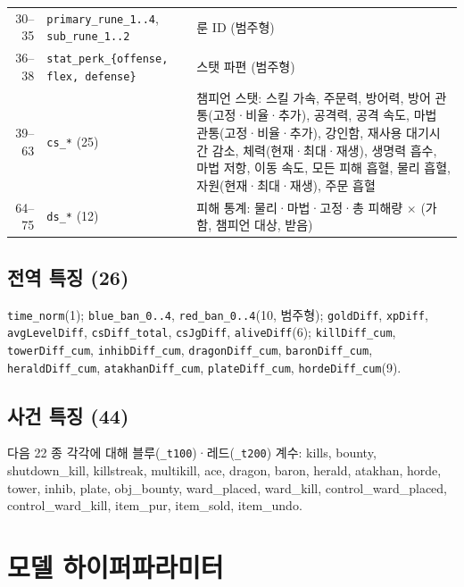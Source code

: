 \begin{longtable}{@{}r>{\raggedright\arraybackslash}p{6.0cm}>{\raggedright\arraybackslash}p{6.7cm}@{}}
  30--35 & \texttt{primary\_rune\_1..4}, \texttt{sub\_rune\_1..2} & 룬 ID (범주형) \\
  36--38 & \texttt{stat\_perk\_\{offense, flex, defense\}} & 스탯 파편 (범주형) \\
  39--63 & \texttt{cs\_*} (25) & 챔피언 스탯: 스킬 가속, 주문력, 방어력, 방어 관통(고정·비율·추가), 공격력, 공격 속도, 마법 관통(고정·비율·추가), 강인함, 재사용 대기시간 감소, 체력(현재·최대·재생), 생명력 흡수, 마법 저항, 이동 속도, 모든 피해 흡혈, 물리 흡혈, 자원(현재·최대·재생), 주문 흡혈 \\
  64--75 & \texttt{ds\_*} (12) & 피해 통계: 물리·마법·고정·총 피해량 $\times$ (가함, 챔피언 대상, 받음) \\
\end{longtable}

\section{전역 특징 (26)}

{\raggedright
\texttt{time\_norm}(1); \texttt{blue\_ban\_0..4}, \texttt{red\_ban\_0..4}(10, 범주형); \texttt{goldDiff}, \texttt{xpDiff}, \texttt{avgLevelDiff}, \texttt{csDiff\_total}, \texttt{csJgDiff}, \texttt{aliveDiff}(6); \texttt{killDiff\_cum}, \texttt{towerDiff\_cum}, \texttt{inhibDiff\_cum}, \texttt{dragonDiff\_cum}, \texttt{baronDiff\_cum}, \texttt{heraldDiff\_cum}, \texttt{atakhanDiff\_cum}, \texttt{plateDiff\_cum}, \texttt{hordeDiff\_cum}(9).
\par}

\section{사건 특징 (44)}

{\raggedright
다음 22 종 각각에 대해 블루(\texttt{\_t100})·레드(\texttt{\_t200}) 계수: kills, bounty, shutdown\_kill, killstreak, multikill, ace, dragon, baron, herald, atakhan, horde, tower, inhib, plate, obj\_bounty, ward\_placed, ward\_kill, control\_ward\_placed, control\_ward\_kill, item\_pur, item\_sold, item\_undo.
\par}

\chapter{모델 하이퍼파라미터}
\label{app:hparams}

